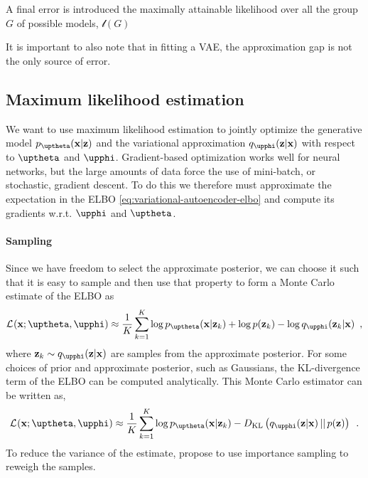 
A final error is introduced  the maximally attainable likelihood over all the group $G$ of possible models, $\mathcal{l}(G)$ 

It is important to also note that in fitting a VAE, the approximation gap is not the only source of error. 


\subsection{Maximum likelihood estimation}
%
We want to use maximum likelihood estimation to jointly optimize the generative model $p_\thetab(\xb|\zb)$ and the variational approximation $q_\phib(\zb|\xb)$ with respect to $\thetab$ and $\phib$. 
Gradient-based optimization works well for neural networks, but the large amounts of data force the use of mini-batch, or stochastic, gradient descent. 
To do this we therefore must approximate the expectation in the ELBO \cref{eq:variational-autoencoder-elbo} and compute its gradients w.r.t. $\phib$ and $\thetab$. 

\paragraph{Sampling}
Since we have freedom to select the approximate posterior, we can choose it such that it is easy to sample and then use that property to form a Monte Carlo estimate of the ELBO as
% 
\begin{equation} \label{eq:variational-autoencoder-elbo-sampling-expanded}
    \mathcal{L}_{}(\xb;\thetab,\phib)
    \approx \frac{1}{K} \sum_{k=1}^K \log p_\thetab(\xb|\zb_k) + \log p(\zb_k) - \log q_\phib(\zb_k|\xb) \enspace , 
\end{equation}
%
where $\zb_k \sim q_\phib(\zb|\xb)$ are samples from the approximate posterior. 
For some choices of prior and approximate posterior, such as Gaussians, the KL-divergence term of the ELBO can be computed analytically. 
This Monte Carlo estimator can be written as,
%
\begin{equation} \label{eq:variational-autoencoder-elbo-sampling-KL}
    \mathcal{L}_{}(\xb;\thetab,\phib)
    \approx \frac{1}{K} \sum_{k=1}^K \log p_\thetab(\xb|\zb_k) - D_\text{KL}\left( q_\phib(\zb|\xb) \,||\, p(\zb) \right) \enspace .
\end{equation}
%
To reduce the variance of the estimate, \textcite{burda_importance_2016} propose to use importance sampling to reweigh the samples.

